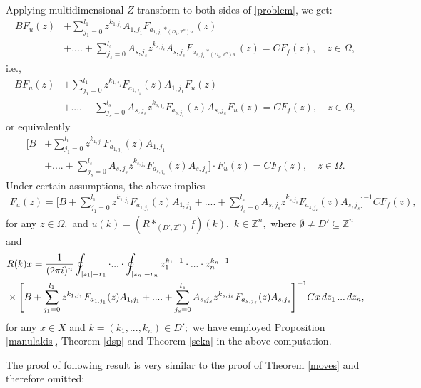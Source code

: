 \documentclass{amsart}
\theoremstyle{definition}
\theoremstyle{remark}
\numberwithin{equation}{section}
\begin{document}
Applying multidimensional $Z$-transform to both sides of \eqref{problem}, we get:{\scriptsize
\begin{align*}
BF_{u}(z)&+\sum_{j_{1}=0}^{l_{1}}z^{k_{1,j_{1}}}A_{1,j_{1}}F_{a_{1,j_{1}} \ast_{(D_{1},{\mathbb Z}^{n})u}}(z)
\\& +....+\sum_{j_{s}=0}^{l_{s}}A_{s,j_{s}}z^{k_{s,j_{s}}}A_{s,j_{s}}F_{a_{s,j_{s}} \ast_{(D_{1},{\mathbb Z}^{n})u}}(z)=CF_{f}(z),\quad z\in \Omega ,
\end{align*}}i.e.,{\scriptsize
\begin{align*}
BF_{u}(z)&+\sum_{j_{1}=0}^{l_{1}}z^{k_{1,j_{1}}}F_{a_{1,j_{1}}}(z)A_{1,j_{1}}F_{u}(z)  
\\& +....+\sum_{j_{s}=0}^{l_{s}}A_{s,j_{s}}z^{k_{s,j_{s}}}F_{a_{s,j_{s}}}(z)A_{s,j_{s}}F_{u}(z)=CF_{f}(z),\quad z\in \Omega ,
\end{align*}}or equivalently{\scriptsize
\begin{align*}
\Biggl[B &+\sum_{j_{1}=0}^{l_{1}}z^{k_{1,j_{1}}}F_{a_{1,j_{1}}}(z)A_{1,j_{1}} 
\\&+....+\sum_{j_{s}=0}^{l_{s}}A_{s,j_{s}}z^{k_{s,j_{s}}}F_{a_{s,j_{s}}}(z)A_{s,j_{s}}\Biggr] \cdot F_{u}(z)=CF_{f}(z),\quad z\in \Omega .
\end{align*}}Under certain assumptions, the above implies{\scriptsize
\begin{align*}
 F_{u}(z)=\Biggl[B +\sum_{j_{1}=0}^{l_{1}}z^{k_{1,j_{1}}}F_{a_{1,j_{1}}}(z)A_{1,j_{1}} 
+....+\sum_{j_{s}=0}^{l_{s}}A_{s,j_{s}}z^{k_{s,j_{s}}}F_{a_{s,j_{s}}}(z)A_{s,j_{s}}\Biggr]^{-1}CF_{f}(z),
\end{align*}}for any $z\in \Omega , $
and $
u(k)= (R\ast_{(D',{\mathbb Z}^{n})} f)(k),$ $k\in {\mathbb Z}^{n},$ where $\emptyset \neq D' \subseteq {\mathbb Z}^{n}$ and{\scriptsize
\begin{align}\notag &
R(k)x=\frac{1}{(2\pi i)^{n}}\oint_{|z_{1}|=r_{1}}\cdot ... \cdot \oint_{|z_{n}|=r_{n}}z_{1}^{k_{1}-1}\cdot ... \cdot z_{n}^{k_{n}-1}
\\\label{gevolt} & \times
\Biggl[B +\sum_{j_{1}=0}^{l_{1}}z^{k_{1,j_{1}}}F_{a_{1,j_{1}}}(z)A_{1,j_{1}} 
+....+\sum_{j_{s}=0}^{l_{s}}A_{s,j_{s}}z^{k_{s,j_{s}}}F_{a_{s,j_{s}}}(z)A_{s,j_{s}}\Biggr]^{-1}Cx\, dz_{1}\, ...\, dz_{n},
\end{align}}for any $x\in X$ and $k=(k_{1},...,k_{n})\in D';$ we have employed Proposition \ref{manulakis}, Theorem \ref{dsp} and Theorem \ref{seka} in the above computation.

The proof of following result is very similar to the proof of Theorem \ref{moves} and therefore omitted:
\end{document}
